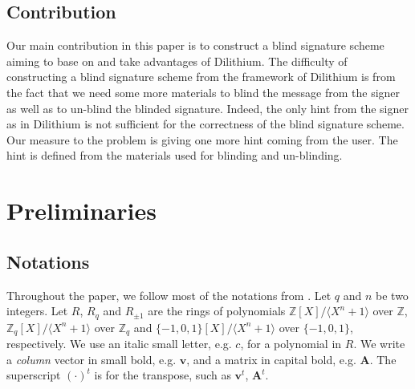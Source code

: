 \documentclass[conference]{IEEEtran}
\begin{document}
		\subsection{Contribution} Our main contribution in this paper is to construct a blind signature scheme aiming to base on and take advantages of \textsf{Dilithium}. The difficulty of constructing a blind signature scheme from the framework of \textsf{Dilithium} is from the fact that we need some more materials to blind the message from the signer as well as to un-blind the blinded signature. Indeed, the only hint from the signer as in \textsf{Dilithium} is not sufficient for the correctness of the blind signature scheme. Our measure to the problem is giving one more hint coming from the user. The hint is defined from the materials used for blinding and un-blinding. %
	\section{Preliminaries}
	\subsection{Notations}
	Throughout the paper, we follow most of the notations from \cite{DLL+17, DKL+19}. Let $q$ and $n$ be two integers. Let $R$, $R_q$ and $R_{\pm 1}$ are the rings of polynomials $\mathbb{Z}[X]/ \langle X^n+1 \rangle$ over $\mathbb{Z}$, $\mathbb{Z}_q[X]/ \langle X^n+1 \rangle$ over $\mathbb{Z}_q$ and $\{-1,0,1\}[X]/ \langle X^n+1 \rangle$ over $\{ -1,0,1\}$, respectively.  We use an italic small letter, e.g. $c$, for a polynomial in $R$. We write a \textit{column} vector in small bold, e.g. $\mathbf{v}$, and a matrix in capital bold, e.g. $\mathbf{A}$. The superscript $(\cdot)^t$ is for the transpose, such as $\mathbf{v}^t$, $\mathbf{A}^t$. 
	
	
\end{document}
